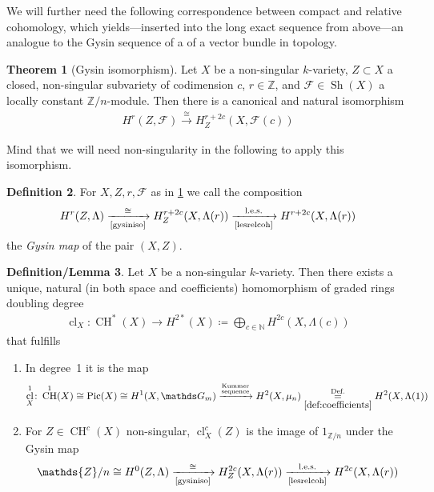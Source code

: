 \documentclass[english]{scrartcl}
\theoremstyle{definition}
\newtheorem{Def}{Definition}[section]
\newtheorem{DefLem}[Def]{Definition/Lemma}
\newtheorem{Thm}[Def]{Theorem}
\theoremstyle{remark}
\newcommand*{\N}{\mathds{N}}
\newcommand*{\Z}{\mathds{Z}}
\newcommand*{\Zmod}[1]{\Z/#1} %
\newcommand*{\F}{\mathcal{F}} %
\DeclareMathOperator{\Sh}{Sh} %
\DeclareMathOperator{\CH}{CH} %
\DeclareMathOperator{\Pic}{Pic} %
\DeclareMathOperator{\CL}{cl} %
\begin{document}
We will further need the following correspondence between compact and
relative cohomology, which yields---inserted into the long exact
sequence from above---an analogue to the Gysin sequence of a of a
vector bundle in topology.
\begin{Thm}[Gysin isomorphism]\label{gysiniso}
  Let $X$ be a non-singular $k$-variety,
  $Z\subset X$ a closed, non-singular subvariety of codimension $c$,
  $r\in\Z$,
  and $\F\in\Sh(X)$ a locally constant $\Zmod{n}$-module.
  Then there is a canonical and natural isomorphism
  \begin{gather*}
    H^{r}\left(Z,\F\right)
    \xrightarrow{\cong}
    H_Z^{r+2c}\left(X,\F(c)\right)
  \end{gather*}
\end{Thm}
Mind that we will need non-singularity in the following to apply this
isomorphism.
\begin{Def}
  For $X,Z,r,\F$ as in \ref{gysiniso} we call the composition
  \begin{gather*}
    H^r(Z,\Lambda)
    \xrightarrow[\text{\ref{gysiniso}}]{\cong}
    H_Z^{r+2c}(X,\Lambda(r))
    \xrightarrow[\text{\ref{lesrelcoh}}]{\text{l.e.s.}}
    H^{r+2c}(X,\Lambda(r))
  \end{gather*}
  the \emph{Gysin map} of the pair $(X,Z)$.
\end{Def}

\begin{DefLem}\label{def:cycleclassmap}
  Let $X$ be a non-singular $k$-variety.
  Then there exists a unique, natural (in both space and coefficients)
  homomorphism of graded rings doubling degree
  \begin{gather*}
    \CL_X\colon \CH^*(X)\rightarrow H^{2*}(X)\coloneqq
    \bigoplus_{c\in\N} H^{2c}(X,\Lambda(c))
  \end{gather*}
  that fulfills
  \begin{enumerate}
  \item In degree~1 it is the map
    \begin{gather*}
      \CL_X^1\colon
      \CH^1(X)\cong \Pic(X)\cong H^1(X,\mathds G_m)
      \xrightarrow{\footnotesize\substack{\text{Kummer}\\\text{sequence}}}
      H^2(X,\mu_n)
      \overset{\text{Def.}}{\underset{\ref{def:coefficients}}{=}}
      H^2(X,\Lambda(1))
    \end{gather*}
  \item For $Z\in\CH^c(X)$ non-singular, $\CL_X^c(Z)$ is the image of
    $1_{\Zmod{n}}$ under the Gysin map
    \begin{gather*}
      \Zmod{n} \cong H^0(Z,\Lambda)
      \xrightarrow[\text{\ref{gysiniso}}]{\cong}
      H_Z^{2c}(X,\Lambda(r))
      \xrightarrow[\text{\ref{lesrelcoh}}]{\text{l.e.s.}}
      H^{2c}(X,\Lambda(r))
    \end{gather*}
  \end{enumerate}
\end{DefLem}
\end{document}
